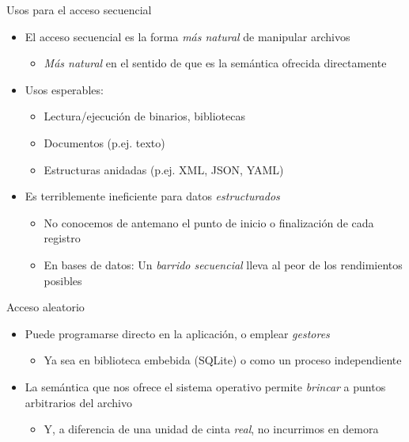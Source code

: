 \documentclass[presentation]{beamer}
\begin{document}
\begin{frame}[label={sec:org88d6a0e}]{Usos para el acceso secuencial}
\begin{itemize}
\item El acceso secuencial es la forma \emph{más natural} de manipular archivos
\begin{itemize}
\item \emph{Más natural} en el sentido de que es la semántica ofrecida directamente
\end{itemize}
\item Usos esperables:
\begin{itemize}
\item Lectura/ejecución de binarios, bibliotecas
\item Documentos (p.ej. texto)
\item Estructuras anidadas (p.ej. XML, JSON, YAML)
\end{itemize}
\item Es terriblemente ineficiente para datos \emph{estructurados}
\begin{itemize}
\item No conocemos de antemano el punto de inicio o finalización de
cada registro
\item En bases de datos: Un \emph{barrido secuencial} lleva al peor de los
rendimientos posibles
\end{itemize}
\end{itemize}
\end{frame}

\begin{frame}[label={sec:org9145357}]{Acceso aleatorio}
\begin{itemize}
\item Puede programarse directo en la aplicación, o emplear \emph{gestores}
\begin{itemize}
\item Ya sea en biblioteca embebida (SQLite) o como un proceso
independiente
\end{itemize}
\item La semántica que nos ofrece el sistema operativo permite \emph{brincar}
a puntos arbitrarios del archivo
\begin{itemize}
\item Y, a diferencia de una unidad de cinta \emph{real}, no incurrimos en
demora
\end{itemize}
\end{itemize}
\end{frame}
\end{document}
